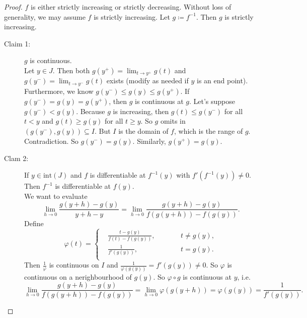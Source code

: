 \documentclass[12pt]{article}
\theoremstyle{plain}
\theoremstyle{definition}
\begin{document}
\begin{proof}
    $f$ is either strictly increasing or strictly decreasing.
    Without loss of generality, we may assume $f$ is strictly increasing.
    Let $g\coloneqq f^{-1}$.
    Then $g$ is strictly increasing.
    \begin{description}
        \item[Claim 1:] $g$ is continuous.\\
            Let $y\in J$.
            Then both $g(y^+) = \lim_{t\rightarrow y^+}g(t)$ and $g(y^-) = \lim_{t\rightarrow y^-}g(t)$ exists (modify as
            needed if $y$ is an end point).
            Furthermore, we know $g(y^-) \leq g(y) \leq g(y^+)$.
            If $g(y^-) = g(y) = g(y^+)$, then $g$ is continuous at $g$.
            Let's suppose $g(y^-) < g(y)$.
            Because $g$ is increasing, then $g(t)\leq g(y^-)$ for all $t<y$ and $g(t)\geq g(y)$ for all $t\geq y$.
            So $g$ omits in $(g(y^-),g(y))\subseteq I$.
            But $I$ is the domain of $f$, which is the range of $g$.
            Contradiction.
            So $g(y^-)=g(y)$. Similarly, $g(y^+) = g(y)$.
        \item[Clam 2:] If $y\in \text{int}(J)$ and $f$ is differentiable at $f^{-1}(y)$ with $f'(f^{-1}(y))\neq0$.
            Then $f^{-1}$ is differentiable at $f(y)$.\\
            We want to evaluate
            \[\lim_{h\rightarrow 0}\frac{g(y+h)-g(y)}{y+h-y} = \lim_{h\rightarrow0}\frac{g(y+h)-g(y)}{f(g(y+h)) -
            f(g(y))}.\]
            Define 
            \[\varphi(t)=\left\{
                    \begin{aligned}
                        &\frac{t-g(y)}{f(t)-f(g(y))},\qquad&& t\neq g(y),\\
                        &\frac{1}{f'(g(y))},&& t=g(y).\\
                    \end{aligned}
            \right.\]
            Then $\frac{1}{\varphi}$ is continuous on $I$ and $\frac{1}{\varphi(g(y))} = f'(g(y))\neq 0.$ 
            So $\varphi$ is continuous on a nerighbourhood of $g(y)$.
            So $\varphi\circ g$ is continuous at $y$, i.e.
            \[\lim_{h\rightarrow0}\frac{g(y+h)-g(y)}{f(g(y+h)) - f(g(y))} = \lim_{h\rightarrow 0}\varphi(g(y+h)) = \varphi(g(y)) = \frac{1}{f'(g(y))}.\]
    \end{description}
\end{proof}
\end{document}
